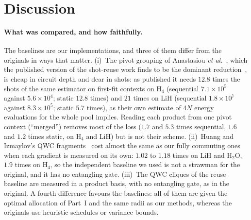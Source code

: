 \documentclass[aps,pra,reprint,superscriptaddress,nofootinbib]{revtex4-2}
\begin{document}
\section{Discussion}
\label{sec:discussion}

\paragraph{What was compared, and how faithfully.} The baselines are our implementations, and three of them differ from the originals in ways that matter. (i)~The pivot grouping of Anastasiou \textit{et al.}~\cite{anastasiou2023}, which the published version of the shot-reuse work finds to be the dominant reduction~\cite{ikhtiarudin2025}, is cheap in circuit depth and dear in shots: as published it needs $12.8$ times the shots of the same estimator on first-fit contexts on H$_4$ (sequential $7.1\times10^{5}$ against $5.6\times10^{4}$; static $12.8$ times) and $21$ times on LiH (sequential $1.8\times10^{7}$ against $8.3\times10^{5}$; static $5.7$ times), as their own estimate of $4N$ energy evaluations for the whole pool implies. Reading each product from one pivot context (``merged'') removes most of the loss ($1.7$ and $5.3$ times sequential, $1.6$ and $1.2$ times static, on H$_4$ and LiH) but is not their scheme. (ii)~Huang and Izmaylov's QWC fragments~\cite{huang2026} cost almost the same as our fully commuting ones when each gradient is measured on its own: $1.02$ to $1.18$ times on LiH and H$_2$O, $1.9$ times on H$_4$, so the independent baseline we used is not a strawman for the original, and it has no entangling gate. (iii)~The QWC cliques of the reuse baseline are measured in a product basis, with no entangling gate, as in the original. A fourth difference favours the baselines: all of them are given the optimal allocation of Part~I and the same radii as our methods, whereas the originals use heuristic schedules or variance bounds.
\end{document}
